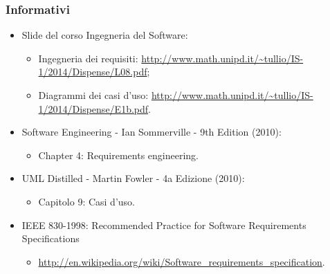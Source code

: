 \subsubsection{Informativi}
\begin{itemize}
	\item Slide del corso Ingegneria del Software:
	\begin{itemize}
		\item Ingegneria dei requisiti: \url{http://www.math.unipd.it/~tullio/IS-1/2014/Dispense/L08.pdf};
		\item Diagrammi dei casi d'uso: \url{http://www.math.unipd.it/~tullio/IS-1/2014/Dispense/E1b.pdf}.
	\end{itemize}
	\item Software Engineering - Ian Sommerville - 9th Edition (2010):
	\begin{itemize}
		\item Chapter 4: Requirements engineering.
	\end{itemize}
	\item \gls{UML} Distilled - Martin Fowler - 4a Edizione (2010):
	\begin{itemize}
		\item Capitolo 9: Casi d’uso.
	\end{itemize}
	\item IEEE 830-1998: Recommended Practice for Software Requirements Specifications
	\begin{itemize}
		\item \url{http://en.wikipedia.org/wiki/Software_requirements_specification}.
	\end{itemize}
\end{itemize}
